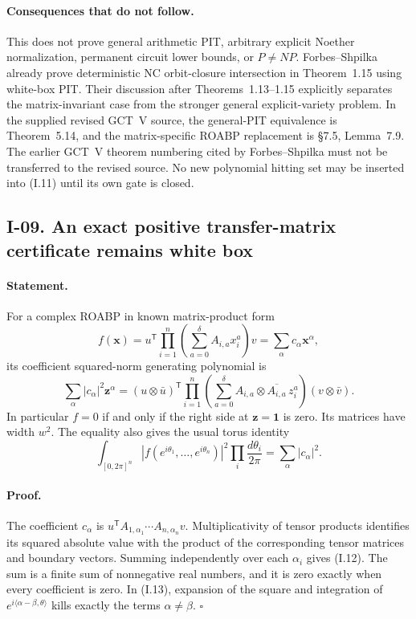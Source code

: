 \documentclass[11pt,a4paper]{article}
\theoremstyle{definition}\newtheorem{definition}{Definition}
\begin{document}
\paragraph{Consequences that do not follow.}
This does not prove general arithmetic PIT, arbitrary explicit
Noether normalization, permanent circuit lower bounds, or
$P\ne NP$.  Forbes--Shpilka already prove deterministic NC
orbit-closure intersection in Theorem~1.15 using white-box PIT.
Their discussion after Theorems~1.13--1.15 explicitly separates
the matrix-invariant case from the stronger general explicit-variety
problem.  In the supplied revised GCT~V source, the general-PIT
equivalence is Theorem~5.14, and the matrix-specific ROABP replacement
is \S7.5, Lemma~7.9.  The earlier GCT~V theorem numbering cited by
Forbes--Shpilka must not be transferred to the revised source.  No new polynomial hitting set
may be inserted into (I.11) until its own gate is closed.

\subsection{I-09. An exact positive transfer-matrix certificate remains white box}
\label{I-09}

\paragraph{Statement.}
For a complex ROABP in known matrix-product form
\[
 f(\mathbf x)=u^{\mathsf T}\prod_{i=1}^n
                  \left(\sum_{a=0}^{\delta}A_{i,a}x_i^a\right)v
             =\sum_{\alpha}c_{\alpha}\mathbf x^{\alpha},
\]
its coefficient squared-norm generating polynomial is
\[
 \sum_{\alpha}|c_\alpha|^2\mathbf z^\alpha
 = (u\otimes\bar u)^{\mathsf T}
     \prod_{i=1}^n\left(\sum_{a=0}^{\delta}
                    A_{i,a}\otimes\overline{A_{i,a}}\,z_i^a\right)
                     (v\otimes\bar v).
\tag{I.12}
\]
In particular $f=0$ if and only if the right side at
$\mathbf z=\mathbf1$ is zero.  Its matrices have width $w^2$.
The equality also gives the usual torus identity
\[
 \int_{[0,2\pi]^n}|f(e^{i\theta_1},\ldots,e^{i\theta_n})|^2
                \prod_i\frac{d\theta_i}{2\pi}
       =\sum_\alpha|c_\alpha|^2.
\tag{I.13}
\]

\paragraph{Proof.}
The coefficient $c_\alpha$ is
$u^{\mathsf T}A_{1,\alpha_1}\cdots A_{n,\alpha_n}v$.
Multiplicativity of tensor products identifies its squared
absolute value with the product of the corresponding tensor
matrices and boundary vectors.  Summing independently over each
$\alpha_i$ gives (I.12).  The sum is a finite sum of nonnegative
real numbers, and it is zero exactly when every coefficient is
zero.  In (I.13), expansion of the square and integration of
$e^{i\langle\alpha-\beta,\theta\rangle}$ kills exactly the terms
$\alpha\ne\beta$. \hfill$\square$
\end{document}
